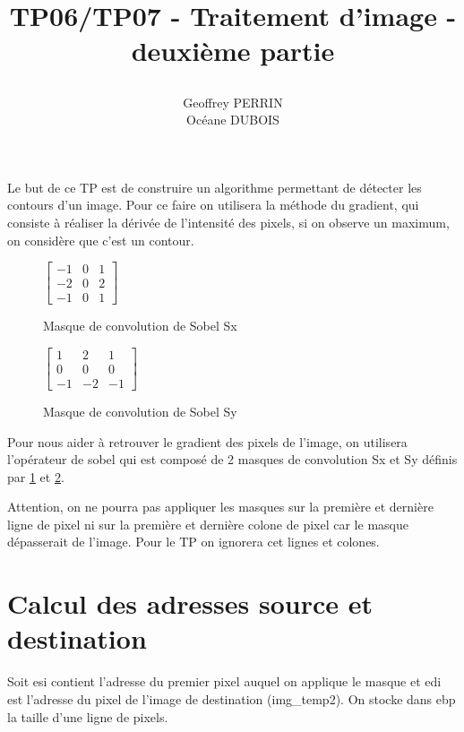 \documentclass[11pt]{report}
\title{\textbf{TP06/TP07 - Traitement d'image - deuxième partie }
\author{Geoffrey PERRIN \\ Océane DUBOIS\\}
\date{}}
\begin{document}
\maketitle

\newpage

Le but de ce TP est de construire un algorithme permettant de détecter les contours d'un image. Pour ce faire on utilisera la méthode du gradient, qui consiste à réaliser la dérivée de l'intensité des pixels, si on observe un maximum, on considère que c'est un contour.


\begin{figure}
\begin{center}
$
\begin{bmatrix}
-1 & 0 & 1 \\
-2 & 0 & 2 \\
-1 & 0 & 1
\end{bmatrix}
$
\end{center}
\label{sx}
\caption{Masque de convolution de Sobel Sx}
\end{figure}


\begin{figure}
\begin{center}
$
\begin{bmatrix}
1 & 2 & 1 \\
0 & 0 & 0 \\
-1 & -2 & -1
\end{bmatrix}
$
\label{sy}
\end{center}
\caption{Masque de convolution de Sobel Sy}
\end{figure}


Pour nous aider à retrouver le gradient des pixels de l'image, on utilisera l'opérateur de sobel qui est composé de 2 masques de convolution Sx et Sy définis par \ref{sx} et \ref{sy}.

Attention, on ne pourra pas appliquer les masques sur la première et dernière ligne de pixel ni sur la première et dernière colone de pixel car le masque dépasserait de l'image. Pour le TP on ignorera cet lignes et colones.


\section{Calcul des adresses source et destination}

Soit esi contient l'adresse du premier pixel auquel on applique le masque et edi est l'adresse du pixel de l'image de destination (img\_temp2). On stocke dans ebp la taille d'une ligne de pixels.
\end{document}
